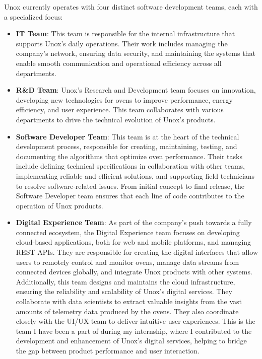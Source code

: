 Unox currently operates with four distinct software development teams, each with a specialized focus:
\begin{itemize}
    \item \textbf{IT Team}: This team is responsible for the internal infrastructure that supports Unox's daily operations. Their work includes managing the company's network, ensuring data security, and maintaining the systems that enable smooth communication and operational efficiency across all departments.

    \item \textbf{R\&D Team}: Unox's Research and Development team focuses on innovation, developing new technologies for ovens to improve performance, energy efficiency, and user experience. This team collaborates with various departments to drive the technical evolution of Unox’s products.

    \item \textbf{Software Developer Team}: This team is at the heart of the technical development process, responsible for creating, maintaining, testing, and documenting the algorithms that optimize oven performance. Their tasks include defining technical specifications in collaboration with other teams, implementing reliable and efficient solutions, and supporting field technicians to resolve software-related issues. From initial concept to final release, the Software Developer team ensures that each line of code contributes to the operation of Unox products.

    \item \textbf{Digital Experience Team}: As part of the company's push towards a fully connected ecosystem, the Digital Experience team focuses on developing cloud-based applications, both for web and mobile platforms, and managing REST APIs. They are responsible for creating the digital interfaces that allow users to remotely control and monitor ovens, manage data streams from connected devices globally, and integrate Unox products with other systems. Additionally, this team designs and maintains the cloud infrastructure, ensuring the reliability and scalability of Unox’s digital services. They collaborate with data scientists to extract valuable insights from the vast amounts of telemetry data produced by the ovens. They also coordinate closely with the UI/UX team to deliver intuitive user experiences.
    This is the team I have been a part of during my internship, where I contributed to the development and enhancement of Unox's digital services, helping to bridge the gap between product performance and user interaction.
\end{itemize}

